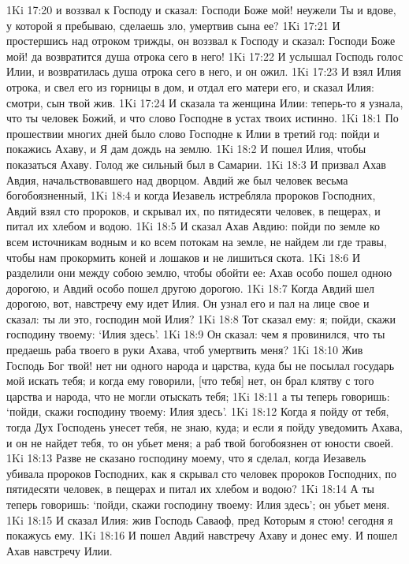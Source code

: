 1Ki 17:20  и воззвал к Господу и сказал: Господи Боже мой! неужели Ты и вдове, у которой я пребываю, сделаешь зло, умертвив сына ее?
1Ki 17:21  И простершись над отроком трижды, он воззвал к Господу и сказал: Господи Боже мой! да возвратится душа отрока сего в него!
1Ki 17:22  И услышал Господь голос Илии, и возвратилась душа отрока сего в него, и он ожил.
1Ki 17:23  И взял Илия отрока, и свел его из горницы в дом, и отдал его матери его, и сказал Илия: смотри, сын твой жив.
1Ki 17:24  И сказала та женщина Илии: теперь-то я узнала, что ты человек Божий, и что слово Господне в устах твоих истинно.
1Ki 18:1  По прошествии многих дней было слово Господне к Илии в третий год: пойди и покажись Ахаву, и Я дам дождь на землю.
1Ki 18:2  И пошел Илия, чтобы показаться Ахаву. Голод же сильный был в Самарии.
1Ki 18:3  И призвал Ахав Авдия, начальствовавшего над дворцом. Авдий же был человек весьма богобоязненный,
1Ki 18:4  и когда Иезавель истребляла пророков Господних, Авдий взял сто пророков, и скрывал их, по пятидесяти человек, в пещерах, и питал их хлебом и водою.
1Ki 18:5  И сказал Ахав Авдию: пойди по земле ко всем источникам водным и ко всем потокам на земле, не найдем ли где травы, чтобы нам прокормить коней и лошаков и не лишиться скота.
1Ki 18:6  И разделили они между собою землю, чтобы обойти ее: Ахав особо пошел одною дорогою, и Авдий особо пошел другою дорогою.
1Ki 18:7  Когда Авдий шел дорогою, вот, навстречу ему идет Илия. Он узнал его и пал на лице свое и сказал: ты ли это, господин мой Илия?
1Ki 18:8  Тот сказал ему: я; пойди, скажи господину твоему: `Илия здесь'.
1Ki 18:9  Он сказал: чем я провинился, что ты предаешь раба твоего в руки Ахава, чтоб умертвить меня?
1Ki 18:10  Жив Господь Бог твой! нет ни одного народа и царства, куда бы не посылал государь мой искать тебя; и когда ему говорили, [что тебя] нет, он брал клятву с того царства и народа, что не могли отыскать тебя;
1Ki 18:11  а ты теперь говоришь: `пойди, скажи господину твоему: Илия здесь'.
1Ki 18:12  Когда я пойду от тебя, тогда Дух Господень унесет тебя, не знаю, куда; и если я пойду уведомить Ахава, и он не найдет тебя, то он убьет меня; а раб твой богобоязнен от юности своей.
1Ki 18:13  Разве не сказано господину моему, что я сделал, когда Иезавель убивала пророков Господних, как я скрывал сто человек пророков Господних, по пятидесяти человек, в пещерах и питал их хлебом и водою?
1Ki 18:14  А ты теперь говоришь: `пойди, скажи господину твоему: Илия здесь'; он убьет меня.
1Ki 18:15  И сказал Илия: жив Господь Саваоф, пред Которым я стою! сегодня я покажусь ему.
1Ki 18:16  И пошел Авдий навстречу Ахаву и донес ему. И пошел Ахав навстречу Илии.
